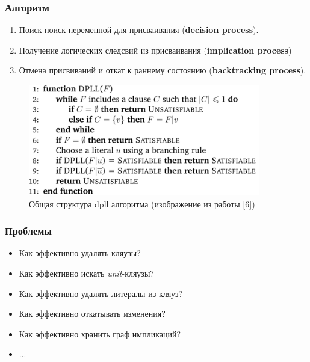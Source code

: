 \documentclass[aspectratio=169,xcolor=table,english]{beamer}
\begin{document}
\begin{frame}[fragile] \frametitle{Алгоритм}
    \begin{minipage}[m]{0.5\linewidth}
    \begin{enumerate}
        \item Поиск поиск переменной для присваивания (\textbf{decision process}).
        \item Получение логических следсвий из присваивания (\textbf{implication process})
        \item Отмена присвиваний и откат к раннему состоянию (\textbf{backtracking process}).
    \end{enumerate}
    \end{minipage}\hfill
    \begin{minipage}[m]{0.5\linewidth}
        \begin{figure}
            \centering
            \includegraphics[width=0.9\textwidth]{figures/dpll.png}
            \caption{Общая структура dpll алгоритма (изображение из работы [6])}
        \end{figure}
    \end{minipage}
\end{frame}

\begin{frame}[fragile] \frametitle{Проблемы}
    \begin{itemize}
        \item Как эффективно удалять кляузы?
        \item Как эффективно искать \textit{unit}-кляузы?
        \item Как эффективно удалять литералы из кляуз? 
        \item Как эффективно откатывать изменения?
        \item Как эффективно хранить граф импликаций?
        \item ...
    \end{itemize}
\end{frame}
\end{document}
